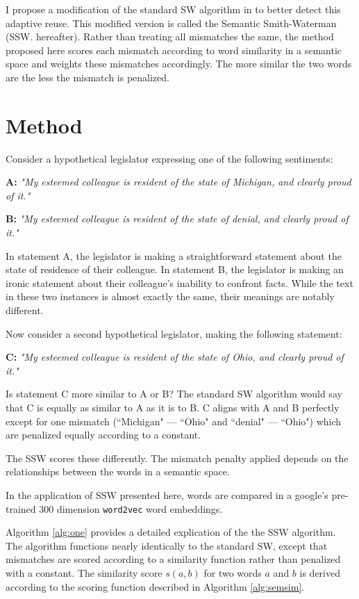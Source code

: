 I propose a modification of the standard SW algorithm in to better detect this adaptive reuse. This modified version is called the Semantic Smith-Waterman (SSW. hereafter). Rather than treating all mismatches the same, the method proposed here scores each mismatch according to word similarity in a semantic space and weights these mismatches accordingly. The more similar the two words are the less the mismatch is penalized.  

\section{Method}


Consider a hypothetical legislator expressing  one of the following sentiments:

\textbf{A:} \emph{"My esteemed colleague is resident of the state of Michigan, and clearly proud of it."}
 
\textbf{B:} \emph{"My esteemed colleague is resident of the state of denial, and clearly proud of it."}
 
In statement A, the legislator is making a straightforward statement about the state of residence of their colleague. In statement B, the legislator is making an ironic statement about their colleague's inability to confront facts. While the text in these two instances is almost exactly the same, their meanings are notably different. 

Now consider a second hypothetical legislator, making the following statement: 

\textbf{C:} \emph{"My esteemed colleague is resident of the state of Ohio, and clearly proud of it."}

Is statement C more similar to A or B? The standard SW algorithm would say that C is equally as similar to A as it is to B. C aligns with A and B perfectly except for one mismatch (``Michigan" --- ``Ohio" and ``denial" --- ``Ohio") which are penalized equally according to a constant.

The SSW scores these differently. The mismatch penalty applied depends on the relationships between the words in a semantic space. 

In the application of SSW presented here, words are compared in a google's pre-trained 300 dimension \texttt{word2vec} word embeddings. 

Algorithm \ref{alg:one} provides a detailed explication of the the SSW algorithm. The algorithm functions nearly identically to the standard SW, except that mismatches are scored according to a similarity function rather than penalized with a constant. The similarity score $s(a,b)$ for two words $a$ and $b$ is derived according to the scoring function described in Algorithm \ref{alg:semsim}.

